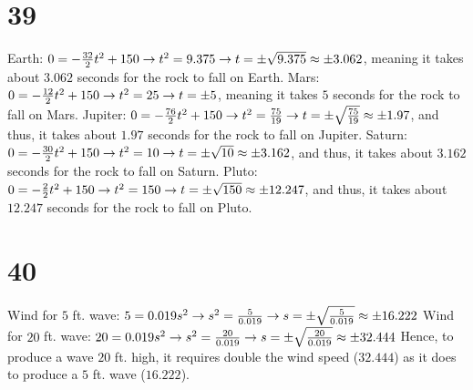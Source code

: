 \documentclass{article}
\theoremstyle{definition}
\begin{document}
\section*{39}
Earth: $0=-\frac{32}{2}t^2+150\newline\rightarrow t^2=9.375\newline\rightarrow t=\pm \sqrt{9.375}\approx\pm 3.062$, meaning it takes about $3.062$ seconds 
for the rock to fall on Earth.\newline
Mars: $0=-\frac{12}{2}t^2+150\newline\rightarrow t^2=25\newline\rightarrow t=\pm 5$, meaning it takes $5$ seconds for the rock to fall on Mars.\newline 
Jupiter: $0=-\frac{76}{2}t^2+150\newline\rightarrow t^2=\frac{75}{19}\newline\rightarrow t=\pm\sqrt\frac{75}{19}\approx \pm 1.97$, and thus, it takes 
about $1.97$ seconds for the rock to fall on Jupiter.\newline
Saturn: $0=-\frac{30}{2}t^2+150\newline\rightarrow t^2=10\newline\rightarrow t=\pm\sqrt{10}\approx\pm 3.162$, and thus, it takes about $3.162$ seconds 
for the rock to fall on Saturn.\newline
Pluto: $0=-\frac{2}{2}t^2+150\newline\rightarrow t^2=150\newline\rightarrow t=\pm\sqrt{150}\approx\pm 12.247$, and thus, it takes about $12.247$ seconds 
for the rock to fall on Pluto.

\section*{40}
Wind for $5$ ft. wave: $5=0.019s^2\newline\rightarrow s^2=\frac{5}{0.019}\newline\rightarrow s=\pm\sqrt\frac{5}{0.019}\approx\pm 16.222$\newline
Wind for $20$ ft. wave: $20=0.019s^2\newline\rightarrow s^2=\frac{20}{0.019}\newline\rightarrow s=\pm\sqrt\frac{20}{0.019}\approx\pm 32.444$\newline
Hence, to produce a wave $20$ ft. high, it requires double the wind speed ($32.444$) as it does to produce a $5$ ft. wave ($16.222$).
\end{document}
